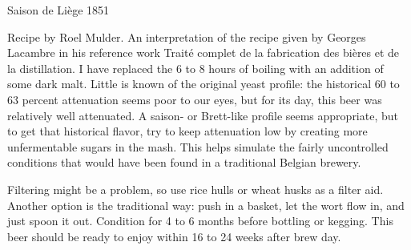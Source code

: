 \stylesection{\stylesaison}

\begin{recipie}{Saison de Liège 1851}

\begin{aboutblock}
Recipe by Roel Mulder. An interpretation of the recipe given by Georges Lacambre
in his reference work Traité complet de la fabrication des bières et de la
distillation. I have replaced the 6 to 8 hours of boiling with an addition of
some dark malt. Little is known of the original yeast profile: the historical 60
to 63 percent attenuation seems poor to our eyes, but for its day, this beer was
relatively well attenuated. A saison- or Brett-like profile seems appropriate,
but to get that historical flavor, try to keep attenuation low by creating more
unfermentable sugars in the mash. This helps simulate the fairly uncontrolled
conditions that would have been found in a traditional Belgian brewery.
\end{aboutblock}


\begin{methodandtiming}
 
\begin{mashsteps}
\end{mashsteps}

\begin{fermentationsteps}
\end{fermentationsteps}

\begin{directions}
Filtering might be a problem, so use rice hulls or wheat husks as a filter aid. Another
option is the traditional way: push in a basket, let the wort flow in, and just spoon
it out. Condition for 4 to 6 months before bottling or kegging. This beer should be ready
to enjoy within 16 to 24 weeks after brew day.
\end{directions}

\end{methodandtiming}

\pagebreak

\begin{ingredientsblock}

\begin{malts}
\end{malts}


\end{ingredientsblock}
\end{recipie}
